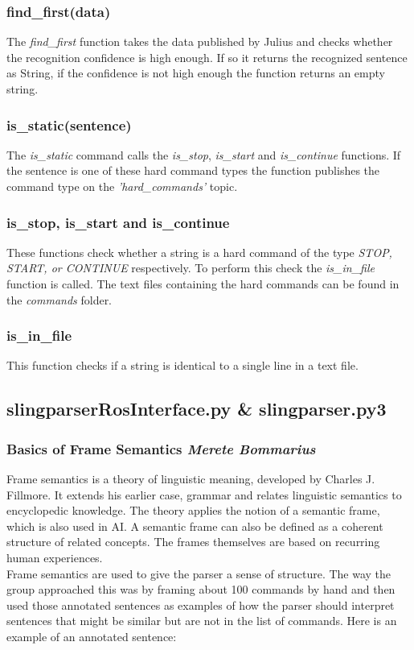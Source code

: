 \documentclass[main.tex]{subfiles}
\begin{document}
        \subsubsection{find\_first(data)}
            The \textit{find\_first} function takes the data published by Julius and checks whether the recognition confidence is high enough. If so it returns the recognized sentence as String, if the confidence is not high enough the function returns an empty string.\\
    
        \subsubsection{is\_static(sentence)}
            The \textit{is\_static} command calls the \textit{is\_stop}, \textit{is\_start} and \textit{is\_continue} functions. If the sentence is one of these hard command types the function publishes the command type on the \textit{'hard\_commands'} topic.
    
        \subsubsection{is\_stop, is\_start and is\_continue}
            These functions check whether a string is a hard command of the type \textit{STOP, START, or CONTINUE} respectively. To perform this check the \textit{is\_in\_file} function is called. The text files containing the hard commands can be found in the \textit{commands} folder.
    
        \subsubsection{is\_in\_file}
            This function checks if a string is identical to a single line in a text file.
    
    \subsection{slingparserRosInterface.py \& slingparser.py3}     	
        \subsubsection{Basics of Frame Semantics \small{\textit{Merete Bommarius}}}        
            Frame semantics is a theory of linguistic meaning, developed by Charles J. Fillmore. It extends his earlier case, grammar and relates linguistic semantics to encyclopedic knowledge. The theory applies the notion of a semantic frame, which is also used in AI. A semantic frame can also be defined as a coherent structure of related concepts. The frames themselves are based on recurring human experiences.\\
            Frame semantics are used to give the parser a sense of structure. The way the group approached this was by framing about 100 commands by hand and then used those annotated sentences as examples of how the parser should interpret sentences that might be similar but are not in the list of commands. 
            Here is an example of an annotated sentence: 
    
\end{document}
